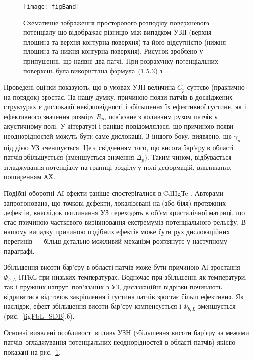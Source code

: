 \begin{figure}
\center
\texttt{[image: figBand]}
\caption{\label{figBand}
Схематичне зображення
просторового розподілу поверхневого потенціалу
що відображає різницю між випадком УЗН (верхня площина та верхня контурна поверхня) та
його відсутністю (нижня площина та нижня контурна поверхня).
Рисунок зроблено у припущенні, що наявні два патчі.
При розрахунку потенціальних поверхонь була використана формула~(1.5.3) з \cite{Tung:MSE}
}%
\end{figure}

Проведені оцінки показують,
що в умовах УЗН величина $C_p$ суттєво (практично на порядок) зростає.
На нашу думку, причиною появи патчів в досліджених структурах є дислокації невідповідності і збільшення їх ефективної густини, як і ефективного значення розміру $R_p$,
пов'язане з коливним рухом патчів у акустичному полі.
У літературі \cite{GELCZUK2014} і раніше повідомлялося, що причиною появи неоднорідностей можуть бути саме дислокації.
З іншого боку, виявлено, що $\gamma_p$ під дією УЗ зменшується.
Це є свідченням того, що висота бар'єру в області патчів збільшується (зменшується значення $\Delta_p$).
Таким чином, відбувається згладжування потенціалу на границі розділу у полі деформацій, викликаних поширенням АХ.

Подібні оборотні АІ ефекти раніше спостерігалися в CdHgTe \cite{Vlasenko2000r}.
Авторами \cite{Vlasenko2000r} запропоновано, що точкові дефекти, локалізовані на (або біля) протяжних дефектів, внаслідок поглинання УЗ переходять в об'єм кристалічної матриці,
що стає причиною часткового вирівнювання екстремумів потенціального рельєфу.
В нашому  випадку причиною подібних ефектів може бути рух дислокаційних перегинів --- більш детально можливий механізм розглянуто у наступному параграфі.

Збільшення висоти бар'єру в області патчів може бути причиною АІ зростання $\Phi_{b,L}$ НТКС при низьких температурах.
Водночас при збільшенні як температури, так і пружних напруг, пов'язаних з УЗ,
дислокаційні відрізки починають відриватися від точок закріплення
 і густина патчів зростає більш ефективно.
Як наслідок, ефект збільшення висоти бар'єру компенсується і $\Phi_{b,L}$ зменшується (рис.~\ref{figFbL_SDB},б).


Основні виявлені особливості впливу УЗН (збільшення висоти бар'єру за межами патчів, згладжування потенціальних неоднорідностей в області патчів) якісно показані на рис.~\ref{figBand}.





